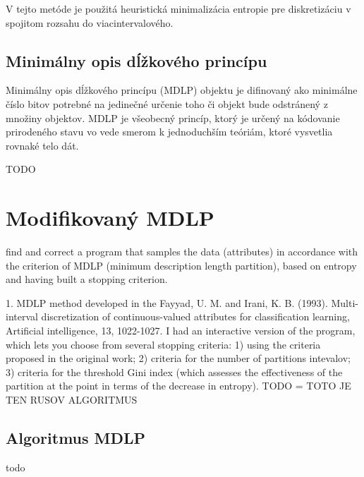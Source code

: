 V tejto metóde je použitá heuristická minimalizácia entropie pre diskretizáciu v spojitom rozsahu do viacintervalového. 

\subsection{Minimálny opis dĺžkového princípu }

Minimálny opis dĺžkového princípu (MDLP) objektu je difinovaný ako minimálne číslo bitov potrebné na jedinečné určenie toho či objekt bude odstránený z množiny objektov. 
MDLP je všeobecný princíp, ktorý je určený na kódovanie prirodeného stavu vo vede smerom k jednoduchším teóriám, ktoré vysvetlia rovnaké telo dát. 

TODO


\section{Modifikovaný MDLP}	

find and correct a program that samples the data (attributes) in accordance with the criterion of MDLP (minimum description length partition), based on entropy and having built a stopping criterion.

1. MDLP method developed in the
Fayyad, U. M. and Irani, K. B. (1993). Multi-interval discretization of continuous-valued attributes for classification learning, Artificial intelligence, 13, 1022-1027.
I had an interactive version of the program, which lets you choose from several stopping criteria:
1) using the criteria proposed in the original work;
2) criteria for the number of partitions intevalov;
3) criteria for the threshold Gini index (which assesses the effectiveness of the partition at the point in terms of the decrease in entropy).
TODO = TOTO JE TEN RUSOV ALGORITMUS

\subsection{Algoritmus MDLP}
todo 




























